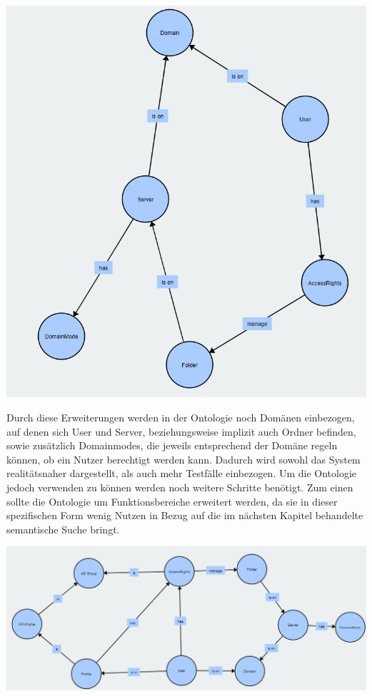 \begin{center}
    \includegraphics[width=1\textwidth]{Thesis/Images/OntologyBig.png}
\end{center}

Durch diese Erweiterungen werden in der Ontologie noch Domänen einbezogen, auf denen sich User und Server, beziehungsweise implizit auch Ordner befinden, sowie zusätzlich Domainmodes, die jeweils entsprechend der Domäne regeln können, ob ein Nutzer berechtigt werden kann. Dadurch wird sowohl das System realitätsnaher dargestellt, als auch mehr Testfälle einbezogen. Um die Ontologie jedoch verwenden zu können werden noch weitere Schritte benötigt. Zum einen sollte die Ontologie um Funktionsbereiche erweitert werden, da sie in dieser spezifischen Form wenig Nutzen in Bezug auf die im nächsten Kapitel behandelte semantische Suche bringt. \\

\begin{center}
    \includegraphics[width=1\textwidth]{Thesis/Images/OntologyProfile.png}
\end{center}

